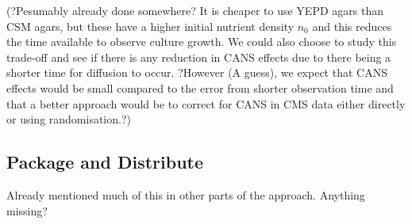 (?Pesumably already done somewhere? It is cheaper to use YEPD agars
than CSM agars, but these have a higher initial nutrient density
\(n_{0}\) and this reduces the time available to observe culture
growth. We could also choose to study this trade-off and see if there
is any reduction in CANS effects due to there being a shorter time for
diffusion to occur. ?However (A guess), we expect that CANS effects
would be small compared to the error from shorter observation time and
that a better approach would be to correct for CANS in CMS data either
directly or using randomisation.?)


\subsection{Package and Distribute}
\label{sec:package-distribute}
Already mentioned much of this in other parts of the
approach. Anything missing?

